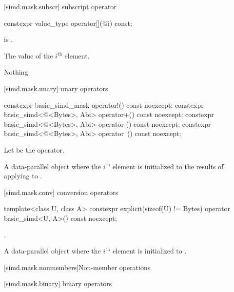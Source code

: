 [simd.mask.subscr]{ subscript operator}

\begin{itemdecl}
constexpr value_type operator[](@\simdsizetype@ i) const;
\end{itemdecl}

\begin{itemdescr}
  \pnum\expects
   is .

  \pnum\returns
  The value of the $i^\text{th}$ element.

  \pnum\throws Nothing.
\end{itemdescr}

[simd.mask.unary]{ unary operators}

\begin{itemdecl}
constexpr basic_simd_mask operator!() const noexcept;
constexpr basic_simd<@\integerfrom@<Bytes>, Abi> operator+() const noexcept;
constexpr basic_simd<@\integerfrom@<Bytes>, Abi> operator-() const noexcept;
constexpr basic_simd<@\integerfrom@<Bytes>, Abi> operator~() const noexcept;
\end{itemdecl}

\begin{itemdescr}
  \pnum Let \op{} be the operator.

  \pnum\returns
  A data-parallel object where the $i^\text{th}$ element is initialized to the results of applying
  \op{} to  \foralli.
\end{itemdescr}

[simd.mask.conv]{ conversion operators}

\begin{itemdecl}
template<class U, class A>
  constexpr explicit(sizeof(U) != Bytes) operator basic_simd<U, A>() const noexcept;
\end{itemdecl}

\begin{itemdescr}
  \pnum\constraints
  .

  \pnum\returns
  A data-parallel object where the $i^\text{th}$ element is initialized to
  .
\end{itemdescr}

[simd.mask.nonmembers]{Non-member operations}

[simd.mask.binary]{ binary operators}

